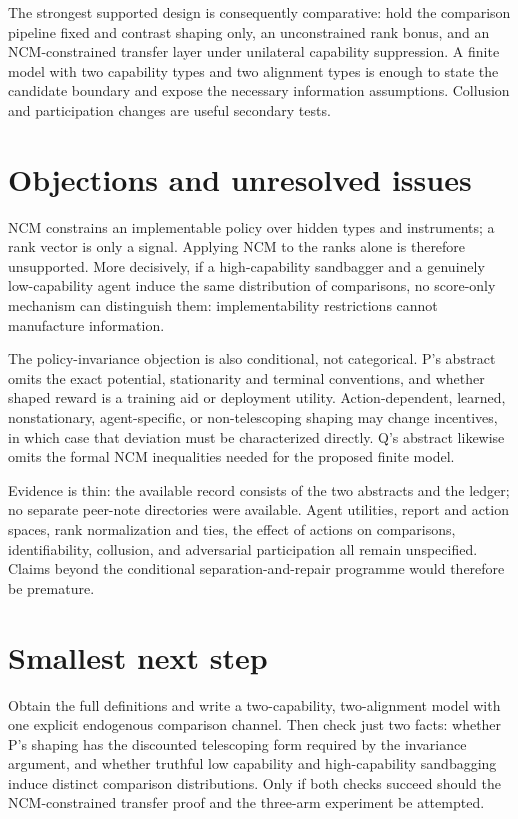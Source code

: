 \documentclass{article}
\begin{document}
The strongest supported design is consequently comparative: hold the comparison pipeline fixed and contrast shaping only, an unconstrained rank bonus, and an NCM-constrained transfer layer under unilateral capability suppression.  A finite model with two capability types and two alignment types is enough to state the candidate boundary and expose the necessary information assumptions.  Collusion and participation changes are useful secondary tests. 

\section{Objections and unresolved issues}

NCM constrains an implementable policy over hidden types and instruments; a rank vector is only a signal.  Applying NCM to the ranks alone is therefore unsupported.  More decisively, if a high-capability sandbagger and a genuinely low-capability agent induce the same distribution of comparisons, no score-only mechanism can distinguish them: implementability restrictions cannot manufacture information. 

The policy-invariance objection is also conditional, not categorical.  P's abstract omits the exact potential, stationarity and terminal conventions, and whether shaped reward is a training aid or deployment utility.  Action-dependent, learned, nonstationary, agent-specific, or non-telescoping shaping may change incentives, in which case that deviation must be characterized directly.  Q's abstract likewise omits the formal NCM inequalities needed for the proposed finite model. 

Evidence is thin: the available record consists of the two abstracts and the ledger; no separate peer-note directories were available.  Agent utilities, report and action spaces, rank normalization and ties, the effect of actions on comparisons, identifiability, collusion, and adversarial participation all remain unspecified.  Claims beyond the conditional separation-and-repair programme would therefore be premature. 

\section{Smallest next step}

Obtain the full definitions and write a two-capability, two-alignment model with one explicit endogenous comparison channel.  Then check just two facts: whether P's shaping has the discounted telescoping form required by the invariance argument, and whether truthful low capability and high-capability sandbagging induce distinct comparison distributions.  Only if both checks succeed should the NCM-constrained transfer proof and the three-arm experiment be attempted. 
\end{document}
